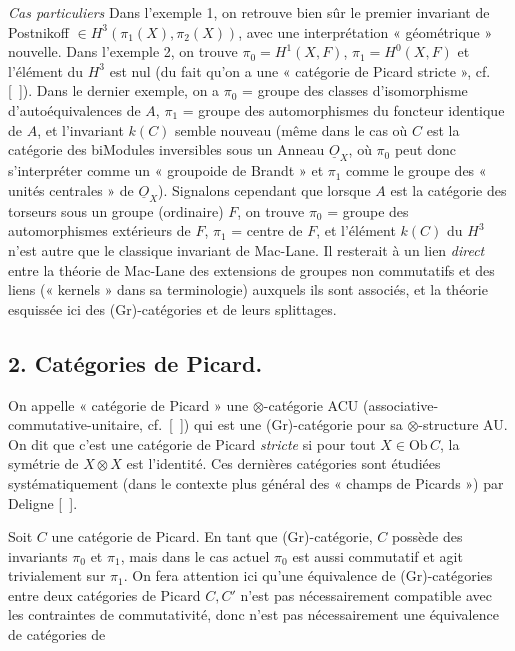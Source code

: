 \documentclass[11pt,a4paper]{article}
\begin{document}
\emph{Cas particuliers} Dans l'exemple 1, on  retrouve
bien sûr le premier invariant de Postnikoff $\in H^3(\pi_1(X), \pi_2(X))$,
avec une interprétation « géométrique » nouvelle. Dans l'exemple 2, on
trouve $\pi_0 = H^1(X,F)$, $\pi_1 = H^0(X,F)$ et l'élément du $H^3$ est nul
(du fait qu'on a une « catégorie de Picard stricte », cf.\ 
[\ ]). Dans le dernier exemple, on a $\pi_0$ = groupe des classes
d'isomorphisme d'autoéquivalences de $A$, $\pi_1$ = groupe des
automorphismes du foncteur identique de $A$, et l'invariant $k(C)$ semble
nouveau (même dans le cas où $C$ est la catégorie des biModules inversibles
sous un Anneau $\underline{O}_X$, où $\pi_0$ peut donc s'interpréter comme
un « groupoide de Brandt » et $\pi_1$ comme le groupe des « unités
centrales » de $\underline{O}_X$). Signalons cependant que lorsque $A$ est
la catégorie des torseurs sous un groupe (ordinaire) $F$, on trouve $\pi_0$
= groupe des automorphismes extérieurs de $F$, $\pi_1$ = centre de $F$, et
l'élément $k(C)$ du $H^3$ n'est autre que le classique invariant de
Mac-Lane. Il resterait à \struck{\ill{}}  un lien
\emph{direct}  entre la théorie de Mac-Lane des extensions
de groupes non commutatifs et des liens (« kernels » dans sa terminologie)
auxquels ils sont associés, et la théorie \struck{\ill{}} esquissée ici des
(Gr)-catégories et de leurs splittages.


\subsection*{2. Catégories de Picard.}

On appelle « catégorie de Picard » une $\otimes$-catégorie ACU
(associative-commutative-unitaire, cf.\ [\ ]) qui est une (Gr)-catégorie
pour sa $\otimes$-structure AU. On dit que c'est une catégorie de Picard
\emph{stricte} si pour tout $X \in \mathrm{Ob}\, C$, la symétrie de $X
\otimes X$ est l'identité. Ces dernières catégories sont étudiées
systématiquement (dans le contexte plus général des « champs de Picards »)
par Deligne [\ ].

Soit $C$ une catégorie de Picard. En tant que (Gr)-catégorie, $C$ possède
des invariants $\pi_0$ et $\pi_1$, mais dans le cas actuel $\pi_0$ est aussi
commutatif et agit trivialement sur $\pi_1$. On fera attention ici qu'une
équivalence de (Gr)-catégories entre deux catégories de Picard $C, C'$ n'est
pas nécessairement compatible avec les contraintes de commutativité, donc
n'est pas nécessairement une équivalence de catégories de
\end{document}
